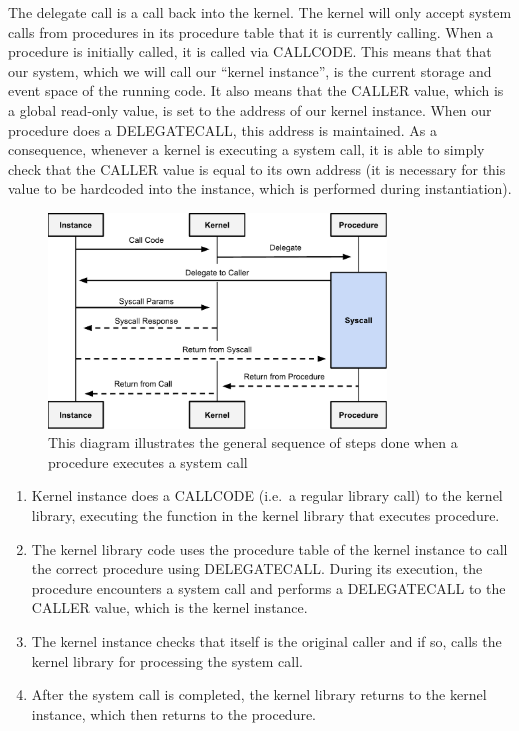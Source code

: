 \documentclass[english,a4paper]{article}
\begin{document}
The delegate call is a call back into the kernel. The kernel will only
accept system calls from procedures in its procedure table that it is
currently calling. When a procedure is initially called, it is called
via CALLCODE. This means that that our system, which we will call our
``kernel instance'', is the current storage and event space of the
running code. It also means that the CALLER value, which is a global
read-only value, is set to the address of our kernel instance. When our
procedure does a DELEGATECALL, this address is maintained. As a
consequence, whenever a kernel is executing a system call, it is able to
simply check that the CALLER value is equal to its own address (it is
necessary for this value to be hardcoded into the instance, which is
performed during instantiation).


\begin{figure}[htbp]
\centering
\includegraphics[width=0.8\textwidth]{media/SystemCalls.pdf}
\caption{This diagram illustrates the general sequence of steps
done when a procedure executes a system call}
\end{figure}

\begin{enumerate}
\def\labelenumi{\arabic{enumi}.}
\item
  Kernel instance does a CALLCODE (i.e.~a regular library call) to the kernel
  library, executing the function in the kernel library that executes
  procedure.
\item
  The kernel library code uses the procedure table of the kernel
  instance to call the correct procedure using DELEGATECALL. During its
  execution, the procedure encounters a system call and performs a
  DELEGATECALL to the CALLER value, which is the kernel instance.
\item
  The kernel instance checks that itself is the original caller and if
  so, calls the kernel library for processing the system call.
\item
  After the system call is completed, the kernel library returns to the
  kernel instance, which then returns to the procedure.
\end{enumerate}
\end{document}

